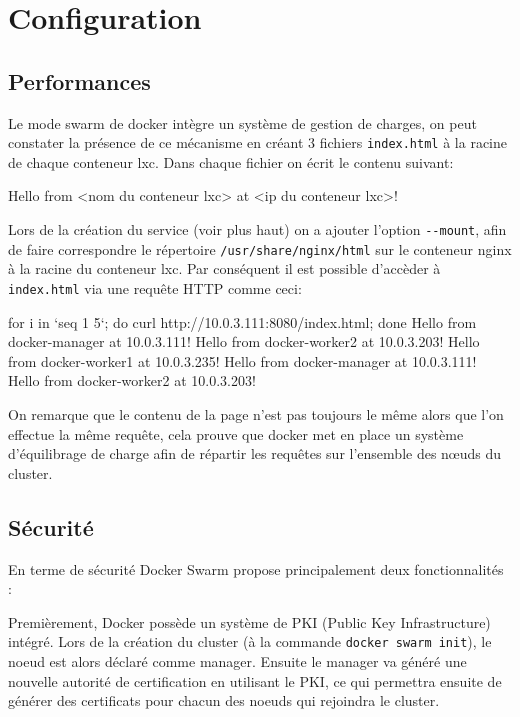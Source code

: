 \chapter{Configuration}

\section{Performances}

Le mode swarm de docker intègre un système de gestion de charges, on peut 
constater la présence de ce mécanisme en créant 3 fichiers \verb:index.html:
à la racine de chaque conteneur lxc. Dans chaque fichier on écrit le contenu
suivant:
\begin{bash}
Hello from <nom du conteneur lxc> at <ip du conteneur lxc>!
\end{bash}
Lors de la création du service (voir plus haut) on a ajouter l'option \verb:--mount:,
afin de faire correspondre le répertoire \verb:/usr/share/nginx/html: sur le conteneur
nginx à la racine du conteneur lxc. Par conséquent il est possible d'accèder à 
\verb:index.html: via une requête HTTP comme ceci:
\begin{bash}
for i in `seq 1 5`; do curl http://10.0.3.111:8080/index.html; done
Hello from docker-manager at 10.0.3.111!
Hello from docker-worker2 at 10.0.3.203!
Hello from docker-worker1 at 10.0.3.235!
Hello from docker-manager at 10.0.3.111!
Hello from docker-worker2 at 10.0.3.203!
\end{bash}
On remarque que le contenu de la page n'est pas toujours le même alors que l'on effectue
la même requête, cela prouve que docker met en place un système d'équilibrage de charge
afin de répartir les requêtes sur l'ensemble des nœuds du cluster.

\section{Sécurité}

En terme de sécurité Docker Swarm propose principalement deux fonctionnalités :\newline

Premièrement, Docker possède un système de PKI (Public Key Infrastructure) intégré.
Lors de la création du cluster (à la commande \verb:docker swarm init:), le noeud est
alors déclaré comme manager. Ensuite le manager va généré une nouvelle autorité de 
certification en utilisant le PKI, ce qui permettra ensuite de générer des certificats pour
chacun des noeuds qui rejoindra le cluster.

